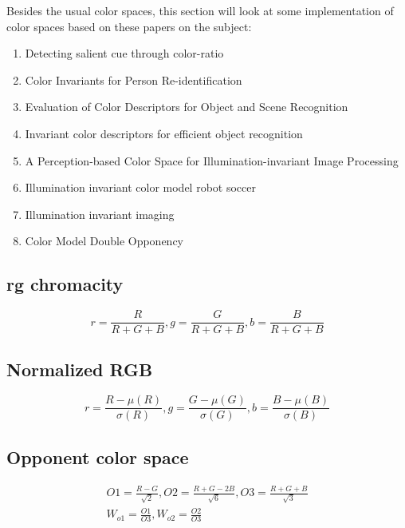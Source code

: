 \documentclass[fypca]{socreport}
\begin{document}
Besides the usual color spaces, this section will look at some implementation
of color spaces based on these papers on the subject:

\begin{enumerate}

  \item Detecting salient cue through color-ratio 
  \item Color Invariants for Person Re-identification 
  \item Evaluation of Color Descriptors for Object and Scene Recognition 
  \item Invariant color descriptors for efficient object recognition 
  \item A Perception-based Color Space for Illumination-invariant Image
    Processing 
  \item Illumination invariant color model robot soccer 
  \item Illumination invariant imaging 
  \item Color Model Double Opponency 

\end{enumerate}

\subsection{rg chromacity}

\[
  r = \frac{R}{R + G + B}, g = \frac{G}{R + G + B}, b = \frac{B}{R + G + B}
\]

\subsection{Normalized RGB}

\[
  r = \frac{R - \mu(R)}{\sigma(R)}, g = \frac{G - \mu(G)}{\sigma(G)}, b =
  \frac{B - \mu(B)}{\sigma(B)}
\]

\subsection{Opponent color space}

\[
\begin{aligned}
  O1 = \frac{R - G}{\sqrt{2}}, O2 = \frac{R + G - 2B}{\sqrt{6}}, O3 = \frac{R +
    G + B}{\sqrt{3}} \\
  W_{o1} = \frac{O1}{O3}, W_{o2} = \frac{O2}{O3}
\end{aligned}
\]
\end{document}
